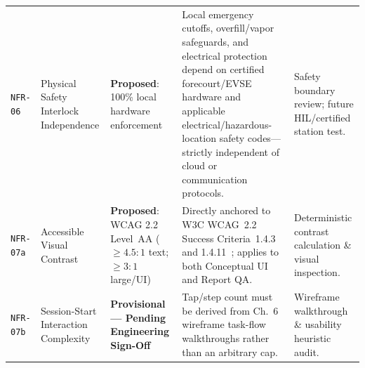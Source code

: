 \begin{table}[htbp]
\begin{tabularx}{\linewidth}{@{}P{17mm} P{26mm} P{27mm} L P{27mm}@{}}
    \texttt{NFR-06} & Physical Safety Interlock Independence & \textbf{Proposed}: 100\% local hardware enforcement & Local emergency cutoffs, overfill/vapor safeguards, and electrical protection depend on certified forecourt/EVSE hardware and applicable electrical/hazardous-location safety codes---strictly independent of cloud or communication protocols. & Safety boundary review; future HIL/certified station test. \\
    \texttt{NFR-07a} & Accessible Visual Contrast & \textbf{Proposed}: WCAG 2.2 Level~AA (\mbox{$\ge 4.5{:}1$} text; \mbox{$\ge 3{:}1$} large/UI) & Directly anchored to W3C WCAG~2.2 Success Criteria~1.4.3 and 1.4.11~\cite{w3c2023wcag22}; applies to both Conceptual UI and Report QA. & Deterministic contrast calculation \& visual inspection. \\
    \texttt{NFR-07b} & Session-Start Interaction Complexity & \textbf{Provisional --- Pending Engineering Sign-Off} & Tap/step count must be derived from Ch.~6 wireframe task-flow walkthroughs rather than an arbitrary cap. & Wireframe walkthrough \& usability heuristic audit. \\
    \bottomrule
  \end{tabularx}
\end{table}

